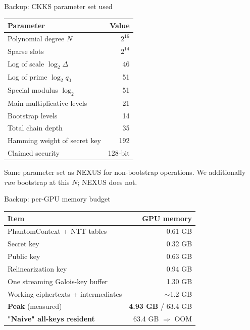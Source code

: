 \documentclass[aspectratio=169]{beamer}
\begin{document}
\begin{frame}{Backup: CKKS parameter set used}
  \scriptsize
  \begin{tabular}{@{}lr@{}}
    \toprule
    Parameter & Value \\
    \midrule
    Polynomial degree $N$                & $2^{16}$ \\
    Sparse slots                         & $2^{14}$ \\
    Log of scale $\log_2 \Delta$         & 46 \\
    Log of prime $\log_2 q_0$            & 51 \\
    Special modulus $\log_2$             & 51 \\
    Main multiplicative levels           & 21 \\
    Bootstrap levels                     & 14 \\
    Total chain depth                    & 35 \\
    Hamming weight of secret key         & 192 \\
    Claimed security                     & 128-bit \\
    \bottomrule
  \end{tabular}
  \vspace{0.8em}
  \normalsize
  Same parameter set as NEXUS for non-bootstrap operations.
  We additionally \emph{run} bootstrap at this $N$; NEXUS does not.
\end{frame}

\begin{frame}{Backup: per-GPU memory budget}
  \scriptsize
  \begin{tabular}{@{}lr@{}}
    \toprule
    Item & GPU memory \\
    \midrule
    PhantomContext + NTT tables       & 0.61 GB \\
    Secret key                        & 0.32 GB \\
    Public key                        & 0.63 GB \\
    Relinearization key               & 0.94 GB \\
    One streaming Galois-key buffer   & 1.30 GB \\
    Working ciphertexts + intermediates & $\sim$1.2 GB \\
    \midrule
    \textbf{Peak} (measured)          & \textbf{4.93 GB} / 63.4 GB \\
    \textbf{"Naive" all-keys resident} & 63.4 GB $\Rightarrow$ OOM \\
    \bottomrule
  \end{tabular}
\end{frame}
\end{document}
